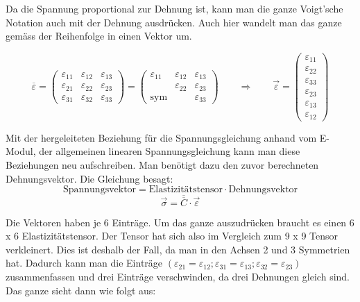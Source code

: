 Da die Spannung proportional zur Dehnung ist, kann man die ganze Voigt'sche Notation auch mit der Dehnung ausdrücken.
Auch hier wandelt man das ganze gemäss der Reihenfolge in einen Vektor um.

\[
\overline{\varepsilon}
=
\begin{pmatrix}
	\varepsilon_{11} & \varepsilon_{12} & \varepsilon_{13} \\ 
	\varepsilon_{21} & \varepsilon_{22} & \varepsilon_{23} \\
	\varepsilon_{31} & \varepsilon_{32} & \varepsilon_{33}
\end{pmatrix}
=
\begin{pmatrix}
	\varepsilon_{11} & \varepsilon_{12} & \varepsilon_{13} \\ 
	                 & \varepsilon_{22} & \varepsilon_{23} \\
	\text{sym}       &                  & \varepsilon_{33}
\end{pmatrix}
\qquad
\Rightarrow
\qquad
\vec{\varepsilon}
=
\begin{pmatrix}
	\varepsilon_{11} \\
	\varepsilon_{22} \\
	\varepsilon_{33} \\
	\varepsilon_{23} \\
	\varepsilon_{13} \\
	\varepsilon_{12}
\end{pmatrix}
\]


Mit der hergeleiteten Beziehung für die Spannungsgleichung anhand vom E-Modul,
der allgemeinen linearen Spannungsgleichung kann man diese Beziehungen neu aufschreiben.
Man benötigt dazu den zuvor berechneten Dehnungsvektor.
Die Gleichung besagt:
\[
\text{Spannungsvektor}
=
\text{Elastizitätstensor}\cdot\text{Dehnungsvektor}
\]
\[
\vec{\sigma}
=
\overline{\overline{C}}\cdot\vec{\varepsilon}
\]

Die Vektoren haben je 6 Einträge. Um das ganze auszudrücken braucht es einen 6 x 6 Elastizitätstensor.
Der Tensor hat sich also im Vergleich zum 9 x 9 Tensor verkleinert.
Dies ist deshalb der Fall, da man in den Achsen 2 und 3 Symmetrien hat.
Dadurch kann man die Einträge $(\varepsilon_{21}=\varepsilon_{12}; \varepsilon_{31}=\varepsilon_{13}; \varepsilon_{32}=\varepsilon_{23})$
zusammenfassen und drei Einträge verschwinden, da drei Dehnungen gleich sind.
Das ganze sieht dann wie folgt aus:

